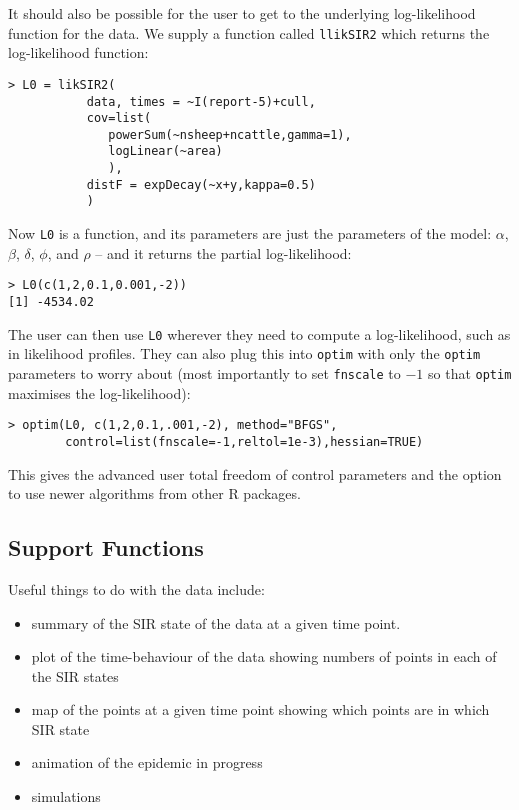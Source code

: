 \documentclass{article}
\begin{document}
It should also be possible for the user to get to the underlying log-likelihood function for the data. 
We supply a function called \verb|llikSIR2| which returns the log-likelihood function:

\begin{verbatim}
> L0 = likSIR2(
           data, times = ~I(report-5)+cull,
           cov=list(
              powerSum(~nsheep+ncattle,gamma=1),
              logLinear(~area)
              ),
           distF = expDecay(~x+y,kappa=0.5)
           )
\end{verbatim}

Now \verb|L0| is a function, and its parameters are just the parameters of the model: $\alpha$, $\beta$, $\delta$, $\phi$, and $\rho$ -- 
and it returns the partial log-likelihood:

\begin{verbatim}
> L0(c(1,2,0.1,0.001,-2))
[1] -4534.02
\end{verbatim}

The user can then use \verb|L0| wherever they need to compute a log-likelihood, such as in likelihood profiles. They can also
plug this into \verb|optim| with only the \verb|optim| parameters to worry about (most importantly 
to set \verb|fnscale| to $-1$ so that \verb|optim| maximises the log-likelihood):

\begin{verbatim}
> optim(L0, c(1,2,0.1,.001,-2), method="BFGS",
        control=list(fnscale=-1,reltol=1e-3),hessian=TRUE)
\end{verbatim}

This gives the advanced user total freedom of control parameters and the option to
use newer algorithms from other R packages.


\subsection*{Support Functions}

Useful things to do with the data include:
\begin{itemize}
\item summary of the SIR state of the data at a given time point.
\item plot of the time-behaviour of the data showing numbers of points in each of the SIR states
\item map of the points at a given time point showing which points are in which SIR state
\item animation of the epidemic in progress
\item simulations
\end{itemize}
\end{document}
